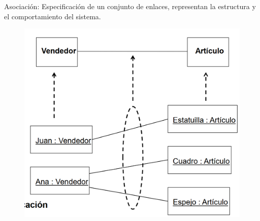 \documentclass[12pt, twoside, openright]{report} %
\begin{document}
	Asociación: Especificación de un conjunto de enlaces, representan la
    estructura y el comportamiento del sistema.
	\begin{figure}[H]
		{\includegraphics[scale=.2]{Untitled 14.png}}
	\end{figure}
\end{document}
